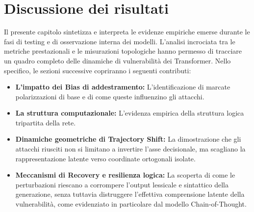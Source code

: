 \chapter{Discussione dei risultati}

Il presente capitolo sintetizza e interpreta le evidenze empiriche emerse durante le fasi di testing e di osservazione interna dei modelli. L'analisi incrociata tra le metriche prestazionali e le misurazioni topologiche hanno permesso di tracciare un quadro completo delle dinamiche di vulnerabilità dei Transformer. 
Nello specifico, le sezioni successive copriranno i seguenti contributi:

\begin{itemize} [noitemsep]
    \item \textbf{L'impatto dei Bias di addestramento:} L'identificazione di marcate polarizzazioni di base e di come queste influenzino gli attacchi.
    \item \textbf{La struttura computazionale:} L'evidenza empirica della struttura logica tripartita della rete.
    \item \textbf{Dinamiche geometriche di Trajectory Shift:} La dimostrazione che gli attacchi riusciti non si limitano a invertire l'asse decisionale, ma scagliano la rappresentazione latente verso coordinate ortogonali isolate.
    \item \textbf{Meccanismi di Recovery e resilienza logica:} La scoperta di come le perturbazioni riescano a corrompere l'output lessicale e sintattico della generazione, senza tuttavia distruggere l'effettiva comprensione latente della vulnerabilità, come evidenziato in particolare dal modello Chain-of-Thought.
\end{itemize}

